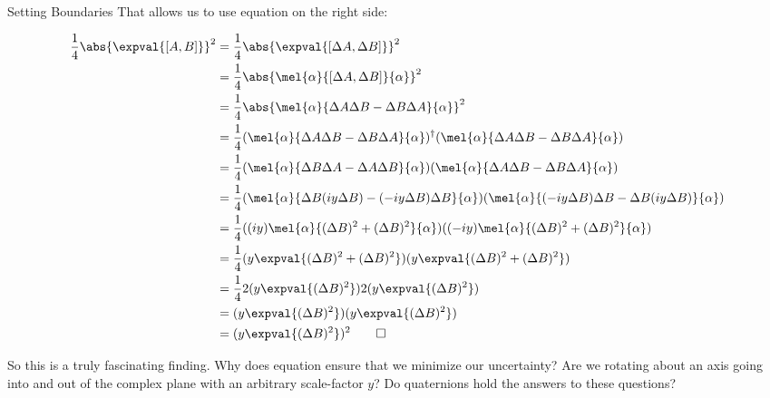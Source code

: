 \begin{answer}
\begin{answerpart}{Setting Boundaries}
    That allows us to use equation  on the right side:


    \begin{equation}
      \begin{split}
        \frac{1}{4} \abs{\expval{[A, B]}}^2
        &=
        \frac{1}{4} \abs{\expval{[\Delta A, \Delta B]}}^2
        \\
        &= 
        \frac{1}{4} \abs{\mel{\alpha}{[\Delta A, \Delta B]}{\alpha}}^2
        \\
        &= 
        \frac{1}{4}
        \abs{\mel{\alpha}{\Delta A\Delta B - \Delta B \Delta A}{\alpha}}^2
        \\
        &= 
        \frac{1}{4}
        (\mel{\alpha}{\Delta A\Delta B - \Delta B \Delta A}{\alpha})^\dagger
        (\mel{\alpha}{\Delta A\Delta B - \Delta B \Delta A}{\alpha})
        \\
        &= 
        \frac{1}{4}
        (\mel{\alpha}{\Delta B\Delta A - \Delta A \Delta B}{\alpha})
        (\mel{\alpha}{\Delta A\Delta B - \Delta B \Delta A}{\alpha})
        \\
        &= 
        \frac{1}{4}
        (\mel{\alpha}{\Delta B(iy\Delta B) - (-iy\Delta B) \Delta B}{\alpha})
        (\mel{\alpha}{(-iy\Delta B)\Delta B - \Delta B(iy\Delta B)}{\alpha})
        \\
        &= 
        \frac{1}{4}
        ((iy)\mel{\alpha}{(\Delta B)^2 + (\Delta B)^2}{\alpha})
        ((-iy)\mel{\alpha}{(\Delta B)^2 + (\Delta B)^2}{\alpha})
        \\
        &= 
        \frac{1}{4}
        (y\expval{(\Delta B)^2 + (\Delta B)^2})
        (y\expval{(\Delta B)^2 + (\Delta B)^2})
        \\
        &= 
        \frac{1}{4}
        2(y\expval{(\Delta B)^2})
        2(y\expval{(\Delta B)^2})
        \\
        &= 
        (y\expval{(\Delta B)^2})
        (y\expval{(\Delta B)^2})
        \\
        &= 
        (y\expval{(\Delta B)^2})^2\qed
        \\
      \end{split}
    \end{equation}

    So this is a truly fascinating finding.  Why does equation
     ensure that we minimize our uncertainty?  Are we
    rotating about an axis going into and out of the complex plane
    with an arbitrary scale-factor $y$?  Do quaternions hold the
    answers to these questions?


\end{answerpart}
\end{answer}
